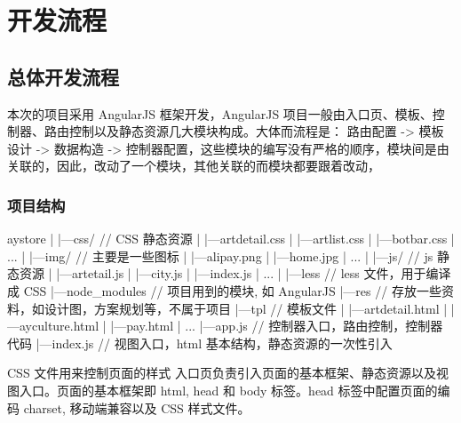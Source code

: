 \documentclass[UTF8]{ctexbook}
\begin{document}
  \chapter{开发流程}
    \label{chap:开发流程}

  \section{总体开发流程}
    \label{sec:总体开发流程}
      本次的项目采用 AngularJS 框架开发，AngularJS 项目一般由入口页、模板、控制器、路由控制以及静态资源几大模块构成。大体而流程是： 路由配置 -> 模板设计 -> 数据构造 -> 控制器配置，这些模块的编写没有严格的顺序，模块间是由关联的，因此，改动了一个模块，其他关联的而模块都要跟着改动，

    \subsection{项目结构}
      \label{subsec:项目结构}
                         aystore
                          |
                          |---css/ // CSS 静态资源
                          |    |---artdetail.css
                          |    |---artlist.css
                          |    |---botbar.css
                          |    ...
                          |
                          |---img/ // 主要是一些图标
                          |    |---alipay.png
                          |    |---home.jpg
                          |    ...
                          |
                          |---js/ // js 静态资源
                          |    |---artetail.js
                          |    |---city.js
                          |    |---index.js
                          |    ...
                          |
                          |---less // less 文件，用于编译成 CSS
                          |---node_modules // 项目用到的模块, 如 AngularJS
                          |---res // 存放一些资料，如设计图，方案规划等，不属于项目
                          |---tpl // 模板文件
                          |    |---artdetail.html
                          |    |---ayculture.html
                          |    |---pay.html
                          |    ...
                          |---app.js   // 控制器入口，路由控制，控制器代码
                          |---index.js // 视图入口，html 基本结构，静态资源的一次性引入

      CSS 文件用来控制页面的样式
      入口页负责引入页面的基本框架、静态资源以及视图入口。页面的基本框架即 html, head 和 body 标签。head 标签中配置页面的编码 charset, 移动端兼容以及 CSS 样式文件。
\end{document}
